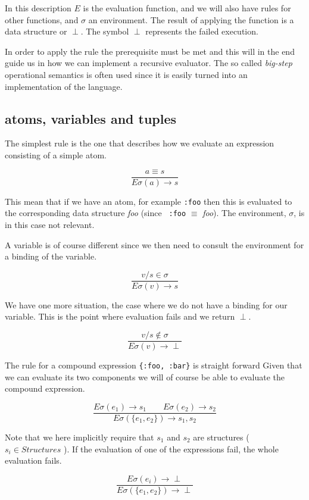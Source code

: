 \documentclass[a4paper,11pt]{article}
\begin{document}
In this description $E$ is the evaluation function, and we will also
have rules for other functions, and $\sigma$ an environment. The result
of applying the function is a data structure or $\perp$. The symbol
$\perp$ represents the failed execution.

In order to apply the rule the prerequisite must be met and this will
in the end guide us in how we can implement a recursive evaluator. The
so called {\em big-step} operational semantics is often used since it
is easily turned into an implementation of the language.

\subsection{atoms, variables and tuples}

The simplest rule is the one that describes how we evaluate an
expression consisting of a simple atom.

$$\frac{a \equiv s}{E\sigma(a) \rightarrow s}$$  

This mean that if we have an atom, for example {\tt :foo} then this is
evaluated to the corresponding data structure {\em foo} (since {\tt
  :foo} $\equiv$ {\em foo}). The environment, $\sigma$, is in this case
not relevant.

A variable is of course different since we then need to consult the
environment for a binding of the variable.

   $$\frac{v/s \in \sigma}{E\sigma(v) \rightarrow s}$$

We have one more situation, the case where we do not have a binding
for our variable. This is the point where evaluation fails and we return $\perp$.

   $$\frac{v/s \not\in \sigma}{E\sigma(v) \rightarrow \perp}$$
   
   
The rule for a compound expression {\tt \{:foo, :bar\}} is straight
forward Given that we can evaluate its two components we will of
course be able to evaluate the compound expression.

$$\frac{ E\sigma(e_1) \rightarrow s_1 \qquad   E\sigma(e_2) \rightarrow s_2}{E\sigma(\lbrace e_1 , e_2\rbrace) \rightarrow {s_1, s_2}}$$

Note that we here implicitly require that $s_1$ and $s_2$ are
structures ( $ s_i \in Structures$ ). If the evaluation of one of the expressions fail, the whole evaluation fails. 

$$\frac{ E\sigma(e_i) \rightarrow \perp }{E\sigma(\lbrace e_1 , e_2\rbrace) \rightarrow \perp}$$
\end{document}
